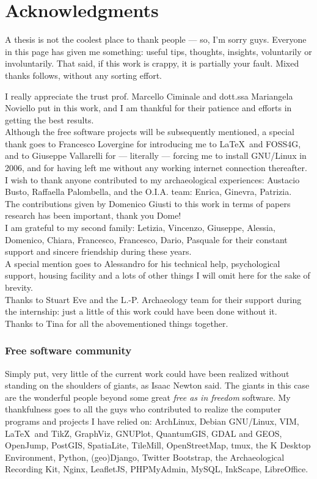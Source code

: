 \chapter*{Acknowledgments}
    A thesis is not the coolest place to thank people --- so, I'm sorry guys. Everyone in this page has given me something: useful tips, thoughts, insights, voluntarily or involuntarily. That said, if this work is crappy, it is partially your fault. Mixed thanks follows, without any sorting effort.
   
    I really appreciate the trust prof. Marcello Ciminale and dott.ssa Mariangela Noviello put in this work, and I am thankful for their patience and efforts in getting the best results.\\
    Although the free software projects will be subsequently mentioned, a special thank goes to Francesco Lovergine for introducing me to \LaTeX~and FOSS4G, and to Giuseppe Vallarelli for --- literally --- forcing me to install GNU/Linux in 2006, and for having left me without any working internet connection thereafter.\\
    I wish to thank anyone contributed to my archaeological experiences: Austacio Busto, Raffaella Palombella, and the O.I.A. team: Enrica, Ginevra, Patrizia.\\
    The contributions given by Domenico Giusti to this work in terms of papers research has been important, thank you Dome!\\
    I am grateful to my second family: Letizia, Vincenzo, Giuseppe, Alessia, Domenico, Chiara, Francesco, Francesco, Dario, Pasquale for their constant support and sincere friendship during these years.\\
    A special mention goes to Alessandro for his technical help, psychological support, housing facility and a lots of other things I will omit here for the sake of brevity.\\
    Thanks to Stuart Eve and the L.-P. Archaeology team for their support during the internship: just a little of this work could have been done without it.\\
    Thanks to Tina for all the abovementioned things together.

    \subsection*{Free software community}
        Simply put, very little of the current work could have been realized without standing on the shoulders of giants, as Isaac Newton said. The giants in this case are the wonderful people beyond some great \emph{free as in freedom} software. My thankfulness goes to all the guys who contributed to realize the computer programs and projects I have relied on: ArchLinux, Debian GNU/Linux, VIM, \LaTeX~and TikZ, GraphViz, GNUPlot, QuantumGIS, GDAL and GEOS, OpenJump, PostGIS, SpatiaLite, TileMill, OpenStreetMap, tmux, the K Desktop Environment, Python, (geo)Django, Twitter Bootstrap, the Archaeological Recording Kit, Nginx, LeafletJS, PHPMyAdmin, MySQL, InkScape, LibreOffice.
